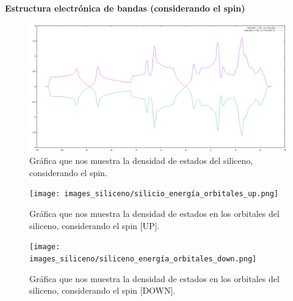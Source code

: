 \begin{frame}

    \textbf{Estructura electrónica de bandas (considerando el spin)}

    \begin{figure}[H]
        \centering
        \includegraphics[scale=0.25]{images_siliceno/densidad_estados_con_spin.png}
        \caption{Gráfica que nos muestra la densidad de estados del siliceno, considerando el spin.}
    \end{figure}
    
\end{frame}

\begin{frame}
    \begin{figure}[H]
        \centering
        \texttt{[image: images\_siliceno/silicio\_energía\_orbitales\_up.png]}
        \caption{Gráfica que nos muestra la densidad de estados en los orbitales del siliceno, considerando el spin [UP].}
    \end{figure}
\end{frame}

\begin{frame}
    \begin{figure}[H]
        \centering
        \texttt{[image: images\_siliceno/siliceno\_energía\_orbitales\_down.png]}
        \caption{Gráfica que nos muestra la densidad de estados en los orbitales del siliceno, considerando el spin [DOWN].}
    \end{figure}
\end{frame}